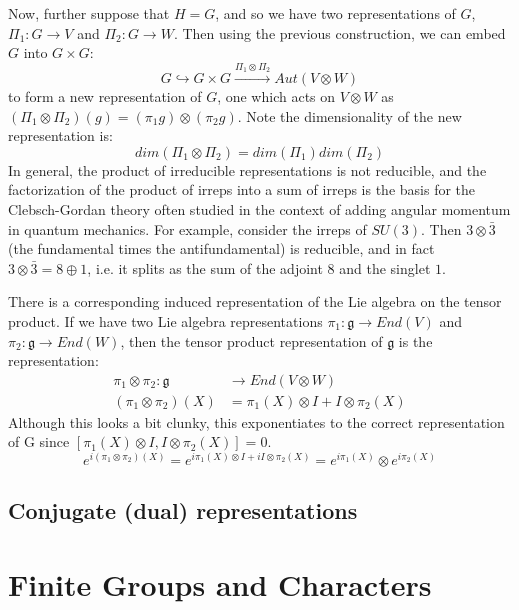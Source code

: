 \documentclass[11pt, oneside]{article}   	%
\theoremstyle{definition}
\begin{document}
Now, further suppose that $H = G$, and so we have two representations of $G$, $\Pi_1 : G\rightarrow V$ 
and $\Pi_2 : G\rightarrow W$. Then using the previous construction, we can embed $G$ into $G\times G$:
\begin{equation}
	G\hookrightarrow G\times G \xrightarrow{\Pi_1\otimes\Pi_2} Aut(V\otimes W)
\end{equation}
to form a new representation of $G$, one which acts on $V\otimes W$ as $(\Pi_1\otimes\Pi_2)(g) = 
(\pi_1 g)\otimes (\pi_2 g)$. Note the dimensionality of the new representation is: 
\begin{equation}
	dim(\Pi_1\otimes\Pi_2) = dim(\Pi_1)dim(\Pi_2)
\end{equation}
In general, the product of irreducible representations is not reducible, and 
the factorization of the product of irreps into a sum of irreps is the basis for the Clebsch-Gordan theory 
often studied in the context of adding angular momentum in quantum mechanics. For example, consider 
the irreps of $SU(3)$. Then $3\otimes\bar 3$ (the fundamental times the antifundamental) is reducible, 
and in fact $3\otimes\bar 3 = 8\oplus 1$, i.e. it splits as the sum of the adjoint $8$ and the singlet $1$. 

There is a corresponding induced representation of the Lie algebra on the tensor product. If we have two 
Lie algebra representations $\pi_1 : \mathfrak g\rightarrow End(V)$ and $\pi_2 : \mathfrak g\rightarrow End(W)$, 
then the tensor product representation of $\mathfrak g$ is the representation:
\begin{align}
	\pi_1\otimes\pi_2: \mathfrak g &\rightarrow End(V\otimes W)\\
	(\pi_1\otimes\pi_2)(X) &= \pi_1(X)\otimes I + I\otimes\pi_2(X)
\end{align}
Although this looks a bit clunky, this exponentiates to the correct representation of G since $[\pi_1(X)\otimes I, I\otimes\pi_2(X)] = 0$.
\begin{equation}
	e^{i(\pi_1\otimes\pi_2)(X)} = e^{i\pi_1(X)\otimes I + iI\otimes\pi_2(X)} = e^{i\pi_1(X)}\otimes e^{i\pi_2(X)}
\end{equation}

\subsection{Conjugate (dual) representations}

\section{Finite Groups and Characters}
\end{document}
